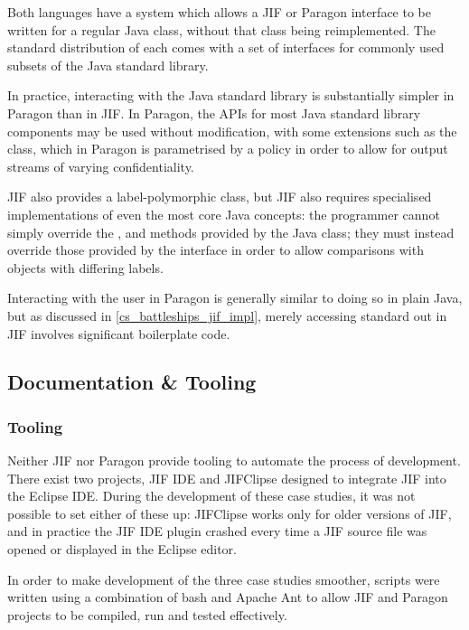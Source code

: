 Both languages have a system which allows a JIF or Paragon interface to be written for a regular Java class, without that class being reimplemented. The standard distribution of each comes with a set of interfaces for commonly used subsets of the Java standard library.

In practice, interacting with the Java standard library is substantially simpler in Paragon than in JIF. In Paragon, the APIs for most Java standard library components may be used without modification, with some extensions such as the  class, which in Paragon is parametrised by a policy in order to allow for output streams of varying confidentiality. 

JIF also provides a label-polymorphic  class, but JIF also requires specialised implementations of even the most core Java concepts: the programmer cannot simply override the ,  and  methods provided by the Java  class; they must instead override those provided by the  interface in order to allow comparisons with objects with differing labels.

Interacting with the user in Paragon is generally similar to doing so in plain Java, but as discussed in \ref{cs_battleships_jif_impl}, merely accessing standard out in JIF involves significant boilerplate code.

\subsection{Documentation \& Tooling}

\subsubsection{Tooling}

Neither JIF nor Paragon provide tooling to automate the process of development. There exist two projects, JIF IDE \cite{jifwebsite} and JIFClipse \cite{hicks2007jifclipse} designed to integrate JIF into the Eclipse IDE. During the development of these case studies, it was not possible to set either of these up: JIFClipse works only for older versions of JIF, and in practice the JIF IDE plugin crashed every time a JIF source file was opened or displayed in the Eclipse editor.

In order to make development of the three case studies smoother, scripts were written using a combination of bash and Apache Ant to allow JIF and Paragon projects to be compiled, run and tested effectively.

